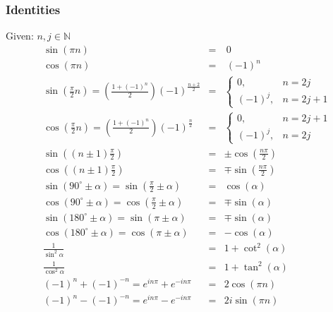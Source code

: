 \subsubsection{Identities}
Given: $n, j \in \mathbb{N}$
\begin{align*}
     & \sin(\pi n)                                                                      & = & \: 0                                                    \\
     & \cos(\pi n)                                                                      & = & \: {(-1)}^n                                             \\
     & \sin(\frac{\pi}{2}n) = \left(\frac{1 + {(-1)}^n}{2}\right){(-1)}^{\frac{n+2}{2}} & = & \begin{cases} 0, &n=2j \\ {(-1)}^j,&n=2j+1 \end{cases}  \\
     & \cos(\frac{\pi}{2}n) = \left(\frac{1+{(-1)}^n}{2}\right){(-1)}^{\frac{n}{2}}     & = & \begin{cases} 0, &n=2j+1 \\ {(-1)}^j, &n=2j \end{cases} \\
     & \sin\left(\left(n\pm 1\right)\frac{\pi}{2}\right)                                & = & \pm \cos\left(\frac{n\pi}{2}\right)                     \\
     & \cos\left(\left(n\pm 1\right)\frac{\pi}{2}\right)                                & = & \mp \sin\left(\frac{n\pi}{2}\right)                     \\
     & \sin(90^\circ\pm\alpha) = \sin(\frac{\pi}{2} \pm \alpha)                         & = & \cos(\alpha)                                            \\
     & \cos(90^\circ\pm\alpha) = \cos(\frac{\pi}{2} \pm \alpha)                         & = & \mp\sin(\alpha)                                         \\
     & \sin(180^\circ\pm\alpha) = \sin(\pi \pm \alpha)                                  & = & \mp\sin(\alpha)                                         \\
     & \cos(180^\circ\pm\alpha) = \cos(\pi \pm \alpha)                                  & = & -\cos(\alpha)                                           \\
     & \frac{1}{\sin^2 \alpha}                                                          & = & 1+\cot^2 (\alpha)                                       \\
     & \frac{1}{\cos^2 \alpha}                                                          & = & 1+\tan^2 (\alpha)                                       \\
     & {(-1)}^n+{(-1)}^{-n}=e^{in\pi}+e^{-in\pi}                                        & = & 2\cos(\pi n)                                            \\
     & {(-1)}^n-{(-1)}^{-n}=e^{in\pi}-e^{-in\pi}                                        & = & 2i\sin(\pi n)
\end{align*}

